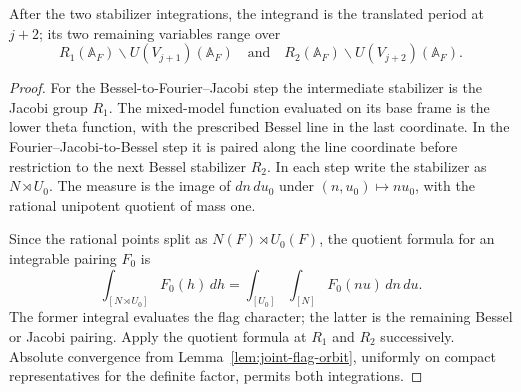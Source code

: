 \begin{lemma}
After the two stabilizer integrations, the integrand is the translated period at \(j+2\); its two remaining variables range over
\[
 R_1(\mathbb A_F)\backslash U(V_{j+1})(\mathbb A_F)\quad\text{and}\quad R_2(\mathbb A_F)\backslash U(V_{j+2})(\mathbb A_F).
\]

\end{lemma}
\begin{proof}
For the Bessel-to-Fourier--Jacobi step the intermediate stabilizer
is the Jacobi group \(R_1\). The mixed-model function evaluated
on its base frame is the lower theta function, with the prescribed
Bessel line in the last coordinate. In the Fourier--Jacobi-to-Bessel
step it is paired along the line coordinate before restriction
to the next Bessel stabilizer \(R_2\). In each step write the
stabilizer as \(N\rtimes U_0\). The measure is the image of
\(dn\,du_0\) under \((n,u_0)\mapsto n u_0\), with the rational
unipotent quotient of mass one.

Since the rational points split as \(N(F)\rtimes U_0(F)\), the
quotient formula for an integrable pairing \(F_0\) is
\[
 \int_{[N\rtimes U_0]} F_0(h)\,dh
    =\int_{[U_0]}\int_{[N]}F_0(nu)\,dn\,du .
\] The former integral evaluates the flag character; the
latter is the remaining Bessel or Jacobi pairing. Apply the quotient
formula at \(R_1\) and \(R_2\) successively. Absolute convergence
from Lemma~\ref{lem:joint-flag-orbit}, uniformly on compact representatives for the definite
factor, permits both integrations.
\end{proof}

